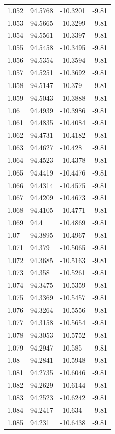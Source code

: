 \begin{tabular}{llll}
1.052 & 94.5768 & -10.3201 & -9.81 \\
1.053 & 94.5665 & -10.3299 & -9.81 \\
1.054 & 94.5561 & -10.3397 & -9.81 \\
1.055 & 94.5458 & -10.3495 & -9.81 \\
1.056 & 94.5354 & -10.3594 & -9.81 \\
1.057 & 94.5251 & -10.3692 & -9.81 \\
1.058 & 94.5147 & -10.379 & -9.81 \\
1.059 & 94.5043 & -10.3888 & -9.81 \\
1.06 & 94.4939 & -10.3986 & -9.81 \\
1.061 & 94.4835 & -10.4084 & -9.81 \\
1.062 & 94.4731 & -10.4182 & -9.81 \\
1.063 & 94.4627 & -10.428 & -9.81 \\
1.064 & 94.4523 & -10.4378 & -9.81 \\
1.065 & 94.4419 & -10.4476 & -9.81 \\
1.066 & 94.4314 & -10.4575 & -9.81 \\
1.067 & 94.4209 & -10.4673 & -9.81 \\
1.068 & 94.4105 & -10.4771 & -9.81 \\
1.069 & 94.4 & -10.4869 & -9.81 \\
1.07 & 94.3895 & -10.4967 & -9.81 \\
1.071 & 94.379 & -10.5065 & -9.81 \\
1.072 & 94.3685 & -10.5163 & -9.81 \\
1.073 & 94.358 & -10.5261 & -9.81 \\
1.074 & 94.3475 & -10.5359 & -9.81 \\
1.075 & 94.3369 & -10.5457 & -9.81 \\
1.076 & 94.3264 & -10.5556 & -9.81 \\
1.077 & 94.3158 & -10.5654 & -9.81 \\
1.078 & 94.3053 & -10.5752 & -9.81 \\
1.079 & 94.2947 & -10.585 & -9.81 \\
1.08 & 94.2841 & -10.5948 & -9.81 \\
1.081 & 94.2735 & -10.6046 & -9.81 \\
1.082 & 94.2629 & -10.6144 & -9.81 \\
1.083 & 94.2523 & -10.6242 & -9.81 \\
1.084 & 94.2417 & -10.634 & -9.81 \\
1.085 & 94.231 & -10.6438 & -9.81 \\

\end{tabular}
